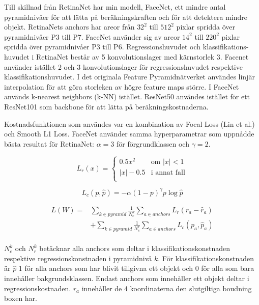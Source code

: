 \documentclass[a4paper,11pt,twoside]{article}
\begin{document}
Till skillnad från RetinaNet har min modell, FaceNet, ett mindre antal pyramidnivåer för att lätta på beräkningskraften och för att detektera mindre objekt. RetinaNets anchors har areor från $32^2$ till $512^2$ pixlar spridda över pyramidnivåer P3 till P7. FaceNet använder sig av areor $14^2$ till $220^2$ pixlar spridda över pyramidnivåer P3 till P6. Regressionshuvudet och klassifikations- huvudet i RetinaNet består av 5 konvolutionslager med kärnstorlek 3. Facenet använder istället 2 och 3 konvolutionslager för regressionshuvudet respektive klassifikationshuvudet. I det originala Feature Pyramidnätverket användes linjär interpolation för att göra storleken av högre feature maps större. I FaceNet används k-nearest neighbors (k-NN) istället. ResNet50 användes istället för ett ResNet101 som backbone för att lätta på beräkningskostnaderna. \cite{resnet} \cite{retinanet} \cite{fpn} 

Kostnadsfunktionen som användes var en kombination av Focal Loss (Lin et al.) och Smooth L1 Loss. FaceNet använder samma hyperparametrar som uppnådde bästa resultat för RetinaNet: $\alpha = 3$ för förgrundklassen och $\gamma=2$. \cite{retinanet}

\begin{equation}
L_r(x) = \begin{cases}
				0.5x^2 & \mbox{om } |x| < 1\\
				|x| - 0.5 & \mbox{i annat fall}\\
			\end{cases}
\end{equation}

\begin{equation}
L_c(p, \hat{p}) = - \alpha (1-p)^{\gamma}p \log{\hat{p}}
\end{equation}

\begin{equation}
\begin{split}
	L(W) = & \sum_{k \in pyramid} \frac{1}{N^k_c} \sum_{a \in anchors} L_r(r_a - \hat{r}_a) \\ 
	& + \sum_{k \in pyramid} \frac{1}{N^r_c} \sum_{a \in anchors} L_c(p_a, \hat{p}_a)  \\ 
\end{split}
\end{equation}

$N^k_c $ och $N^k_r $ betäcknar alla anchors som deltar i klassifikationskonstnaden respektive regressionskonstnaden i pyramidnivå $k$. För klassifikationskonstnaden är $\hat{p}$ 1 för alla anchors som har blivit tillgivna ett objekt och 0 för alla som bara innehåller bakgrundsklassen. Endast anchors som innehåller ett objekt deltar i regressionskostnaden. $r_a$ innehåller de 4 koordinaterna den slutgiltiga boudning boxen har.
\end{document}
